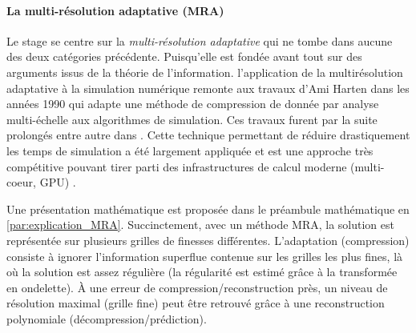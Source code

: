         \paragraph{La multi-résolution adaptative (MRA)}
        Le stage se centre sur la \textit{multi-résolution adaptative} \cite{harten1994} qui
        ne tombe dans aucune des deux catégories précédente. Puisqu'elle est fondée avant tout sur des arguments issus de la théorie de l'information.
        l’application de la multirésolution adaptative à la simulation numérique remonte aux travaux d'Ami Harten \cite{harten1994} dans les années 1990 qui adapte 
        une méthode de compression de donnée par analyse multi-échelle aux algorithmes de simulation.
        Ces travaux furent par la suite prolongés entre autre dans \cite{Kaibara2001,Cohen2003}.
        Cette technique permettant de réduire drastiquement les temps de simulation a été largement appliquée et 
        est une approche très compétitive \cite{compare_MRA_AMR} pouvant tirer parti des infrastructures de calcul moderne (multi-coeur, GPU) \cite{GPU_bench,duart2011}.\par
        Une présentation mathématique est proposée dans le préambule mathématique en \ref{par:explication_MRA}.
        Succinctement, avec un méthode MRA, la solution est représentée sur plusieurs grilles de finesses différentes.
        L'adaptation (compression) consiste à ignorer l'information superflue contenue sur les grilles les plus fines, là où la solution est assez régulière (la régularité est estimé grâce à la transformée en ondelette).
        À une erreur de compression/reconstruction près, un niveau de résolution maximal (grille fine) peut être retrouvé 
        grâce à une reconstruction polynomiale (décompression/prédiction).\par 
% 


